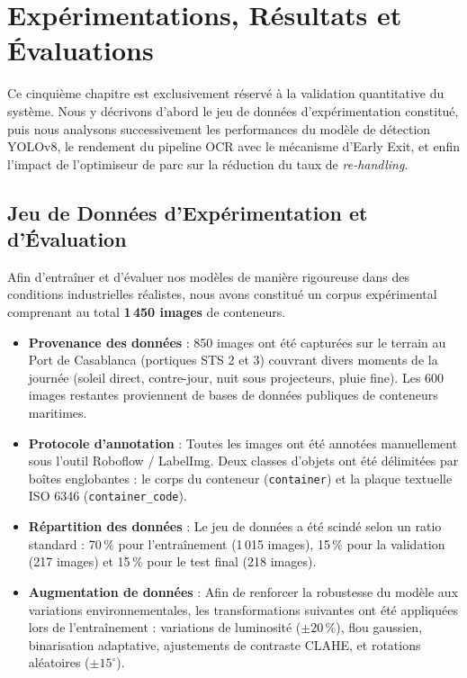 \documentclass[12pt,a4paper]{article}
\begin{document}
\newpage

\section{Expérimentations, Résultats et Évaluations}

Ce cinquième chapitre est exclusivement réservé à la validation quantitative du système. Nous y décrivons d'abord le jeu de données d'expérimentation constitué, puis nous analysons successivement les performances du modèle de détection YOLOv8, le rendement du pipeline OCR avec le mécanisme d'Early Exit, et enfin l'impact de l'optimiseur de parc sur la réduction du taux de \textit{re-handling}.

\subsection{Jeu de Données d'Expérimentation et d'Évaluation}

Afin d'entraîner et d'évaluer nos modèles de manière rigoureuse dans des conditions industrielles réalistes, nous avons constitué un corpus expérimental comprenant au total \textbf{1\,450 images} de conteneurs.
\begin{itemize}
  \item \textbf{Provenance des données} : 850 images ont été capturées sur le terrain au Port de Casablanca (portiques STS 2 et 3) couvrant divers moments de la journée (soleil direct, contre-jour, nuit sous projecteurs, pluie fine). Les 600 images restantes proviennent de bases de données publiques de conteneurs maritimes.
  \item \textbf{Protocole d'annotation} : Toutes les images ont été annotées manuellement sous l'outil Roboflow / LabelImg. Deux classes d'objets ont été délimitées par boîtes englobantes : le corps du conteneur (\texttt{container}) et la plaque textuelle ISO 6346 (\texttt{container\_code}).
  \item \textbf{Répartition des données} : Le jeu de données a été scindé selon un ratio standard : 70\,\% pour l'entraînement (1\,015 images), 15\,\% pour la validation (217 images) et 15\,\% pour le test final (218 images).
  \item \textbf{Augmentation de données} : Afin de renforcer la robustesse du modèle aux variations environnementales, les transformations suivantes ont été appliquées lors de l'entraînement : variations de luminosité ($\pm 20\,\%$), flou gaussien, binarisation adaptative, ajustements de contraste CLAHE, et rotations aléatoires ($\pm 15^\circ$).
\end{itemize}
\end{document}
